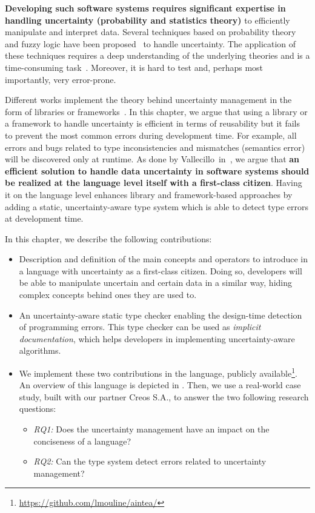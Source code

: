 \textbf{Developing such software systems requires significant expertise in handling uncertainty (probability and statistics theory)} to efficiently manipulate and interpret data. 
Several techniques based on probability theory and fuzzy logic have been proposed~\cite{zadeh1996fuzzy,metrology2008evaluation,shafer1992dempster} to handle uncertainty. 
The application of these techniques requires a deep understanding of the underlying theories and is a time-consuming task~\cite{DBLP:conf/quatic/VallecilloMO16}.
Moreover, it is hard to test and, perhaps most importantly, very error-prone.

Different works implement the theory behind uncertainty management in the form of libraries or frameworks~\cite{url:InferNET18, baudin2017openturns}.  
In this chapter, we argue that using a library or a framework to handle uncertainty is efficient in terms of reusability but it fails to prevent the most common errors during development time. 
For example, all errors and bugs related to type inconsistencies and mismatches (semantics error) will be discovered only at runtime.
As done by Vallecillo~\etal in~\cite{DBLP:conf/quatic/VallecilloMO16}, we argue that \textbf{an efficient solution to handle data uncertainty in software systems should be realized at the language level itself with a first-class citizen}. 
Having it on the language level enhances library and framework-based approaches by adding a static, uncertainty-aware type system which is able to detect type errors at development time.

In this chapter, we describe the following contributions: 
\begin{itemize}
	\vspace{-0.5em}
	\setlength\itemsep{-0.3em}
    \item Description and definition of the main concepts and operators to introduce in a language with uncertainty as a first-class citizen. Doing so, developers will be able to manipulate uncertain and certain data in a similar way, hiding complex concepts behind ones they are used to. 
    \item An uncertainty-aware static type checker enabling the design-time detection of programming errors. This type checker can be used as \textit{implicit documentation}, which helps developers in implementing uncertainty-aware algorithms.
    \item We implement these two contributions in the \langName{} language, publicly available\footnote{\url{https://github.com/lmouline/aintea/}}. An overview of this language is depicted in . Then, we use a real-world case study, built with our partner Creos S.A., to answer the two following research questions: 
    \begin{itemize}
   		\vspace{-0.5em}
		\setlength\itemsep{-0.3em}
    	\item \textit{RQ1:} Does the uncertainty management have an impact on the conciseness of a language? 
		\item \textit{RQ2:} Can the type system detect errors related to uncertainty management?
    \end{itemize}
\end{itemize}

